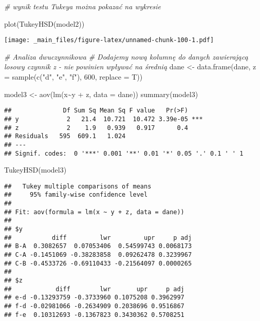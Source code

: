 \documentclass[
]{book}
\newenvironment{Shaded}{\begin{snugshade}}{\end{snugshade}}
\newcommand{\AttributeTok}[1]{\textcolor[rgb]{0.77,0.63,0.00}{#1}}
\newcommand{\CommentTok}[1]{\textcolor[rgb]{0.56,0.35,0.01}{\textit{#1}}}
\newcommand{\DecValTok}[1]{\textcolor[rgb]{0.00,0.00,0.81}{#1}}
\newcommand{\FunctionTok}[1]{\textcolor[rgb]{0.00,0.00,0.00}{#1}}
\newcommand{\NormalTok}[1]{#1}
\newcommand{\OtherTok}[1]{\textcolor[rgb]{0.56,0.35,0.01}{#1}}
\newcommand{\SpecialCharTok}[1]{\textcolor[rgb]{0.00,0.00,0.00}{#1}}
\newcommand{\StringTok}[1]{\textcolor[rgb]{0.31,0.60,0.02}{#1}}
\begin{document}
\begin{Shaded}
\begin{Highlighting}[]
\CommentTok{\# wynik testu Tukeya można pokazać na wykresie}

\FunctionTok{plot}\NormalTok{(}\FunctionTok{TukeyHSD}\NormalTok{(model2))}
\end{Highlighting}
\end{Shaded}

\texttt{[image: \_main\_files/figure-latex/unnamed-chunk-100-1.pdf]}

\begin{Shaded}
\begin{Highlighting}[]
\CommentTok{\# Analiza dwuczynnikowa}
\CommentTok{\# Dodajemy nową kolumnę do danych zawierającą losowy czynnik z {-} nie powinien wpływać na średnią}
\NormalTok{dane }\OtherTok{\textless{}{-}} \FunctionTok{data.frame}\NormalTok{(dane, }\AttributeTok{z =} \FunctionTok{sample}\NormalTok{(}\FunctionTok{c}\NormalTok{(}\StringTok{"d"}\NormalTok{, }\StringTok{"e"}\NormalTok{, }\StringTok{"f"}\NormalTok{), }\DecValTok{600}\NormalTok{, }\AttributeTok{replace =}\NormalTok{ T))}

\NormalTok{model3 }\OtherTok{\textless{}{-}} \FunctionTok{aov}\NormalTok{(}\FunctionTok{lm}\NormalTok{(x}\SpecialCharTok{\textasciitilde{}}\NormalTok{y }\SpecialCharTok{+}\NormalTok{ z, }\AttributeTok{data =}\NormalTok{ dane))}
\FunctionTok{summary}\NormalTok{(model3)}
\end{Highlighting}
\end{Shaded}

\begin{verbatim}
##              Df Sum Sq Mean Sq F value   Pr(>F)    
## y             2   21.4  10.721  10.472 3.39e-05 ***
## z             2    1.9   0.939   0.917      0.4    
## Residuals   595  609.1   1.024                     
## ---
## Signif. codes:  0 '***' 0.001 '**' 0.01 '*' 0.05 '.' 0.1 ' ' 1
\end{verbatim}

\begin{Shaded}
\begin{Highlighting}[]
\FunctionTok{TukeyHSD}\NormalTok{(model3)}
\end{Highlighting}
\end{Shaded}

\begin{verbatim}
##   Tukey multiple comparisons of means
##     95% family-wise confidence level
## 
## Fit: aov(formula = lm(x ~ y + z, data = dane))
## 
## $y
##           diff         lwr         upr     p adj
## B-A  0.3082657  0.07053406  0.54599743 0.0068173
## C-A -0.1451069 -0.38283858  0.09262478 0.3239967
## C-B -0.4533726 -0.69110433 -0.21564097 0.0000265
## 
## $z
##            diff        lwr       upr     p adj
## e-d -0.13293759 -0.3733960 0.1075208 0.3962997
## f-d -0.02981066 -0.2634909 0.2038696 0.9516867
## f-e  0.10312693 -0.1367823 0.3430362 0.5708251
\end{verbatim}
\end{document}
